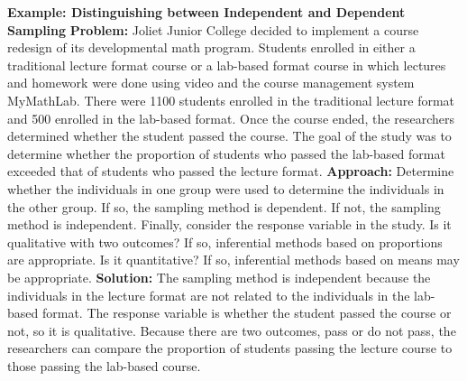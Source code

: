 \documentclass{report}
\begin{document}
    \begin{mdframed}
      \textbf{Example:  Distinguishing between Independent and Dependent Sampling}
      \bigbreak \noindent 
      \textbf{Problem:}
      Joliet Junior College decided to implement a course redesign of its developmental math program. Students enrolled in either a traditional lecture format course or a lab-based format course in which lectures and homework were done using video and the course management system MyMathLab. There were 1100 students enrolled in the traditional lecture format and 500 enrolled in the lab-based format. Once the course ended, the researchers determined whether the student passed the course. The goal of the study was to determine whether the proportion of students who passed the lab-based format exceeded that of students who passed the lecture format.
      \bigbreak \noindent 
      \textbf{Approach:}
      Determine whether the individuals in one group were used to determine the individuals in the other group. If so, the sampling method is dependent. If not, the sampling method is independent. Finally, consider the response variable in the study. Is it qualitative with two outcomes? If so, inferential methods based on proportions are appropriate. Is it quantitative? If so, inferential methods based on means may be appropriate.
      \bigbreak \noindent 
      \textbf{Solution:}
      \bigbreak \noindent 
      The sampling method is independent because the individuals in the lecture format are not related to the individuals in the lab-based format. The response variable is whether the student passed the course or not, so it is qualitative. Because there are two outcomes, pass or do not pass, the researchers can compare the proportion of students passing the lecture course to those passing the lab-based course.

    \end{mdframed}
\end{document}
